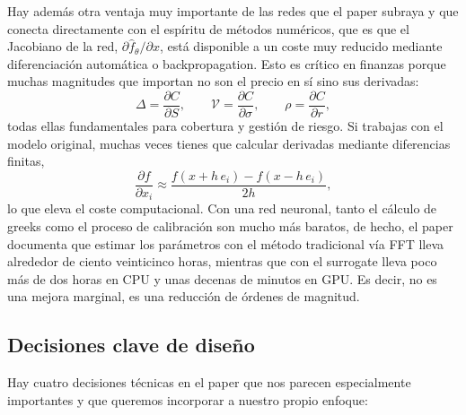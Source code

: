 \documentclass[11pt,a4paper]{article}
\begin{document}
Hay además otra ventaja muy importante de las redes que el paper subraya y que conecta directamente con el espíritu de métodos numéricos, que es que el Jacobiano de la red, $\partial \hat{f}_\theta / \partial x$, está disponible a un coste muy reducido mediante diferenciación automática o backpropagation. Esto es crítico en finanzas porque muchas magnitudes que importan no son el precio en sí sino sus derivadas:
\begin{equation}
\Delta = \frac{\partial C}{\partial S}, \qquad \mathcal{V} = \frac{\partial C}{\partial \sigma}, \qquad \rho = \frac{\partial C}{\partial r},
\end{equation}
todas ellas fundamentales para cobertura y gestión de riesgo. Si trabajas con el modelo original, muchas veces tienes que calcular derivadas mediante diferencias finitas,
\begin{equation}
\frac{\partial f}{\partial x_i} \approx \frac{f(x + h\, e_i) - f(x - h\, e_i)}{2h},
\end{equation}
lo que eleva el coste computacional. Con una red neuronal, tanto el cálculo de greeks como el proceso de calibración son mucho más baratos, de hecho, el paper documenta que estimar los parámetros con el método tradicional vía FFT lleva alrededor de ciento veinticinco horas, mientras que con el surrogate lleva poco más de dos horas en CPU y unas decenas de minutos en GPU. Es decir, no es una mejora marginal, es una reducción de órdenes de magnitud.

\subsection{Decisiones clave de diseño}

Hay cuatro decisiones técnicas en el paper que nos parecen especialmente importantes y que queremos incorporar a nuestro propio enfoque:
\end{document}
